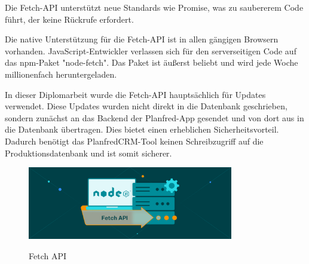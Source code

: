 Die Fetch-API unterstützt neue Standards wie Promise, was zu saubererem Code führt, der keine Rückrufe erfordert.

Die native Unterstützung für die Fetch-API ist in allen gängigen Browsern vorhanden. JavaScript-Entwickler verlassen sich für den serverseitigen Code auf das npm-Paket "node-fetch". Das Paket ist äußerst beliebt und wird jede Woche millionenfach heruntergeladen.

In dieser Diplomarbeit wurde die Fetch-API hauptsächlich für Updates verwendet. Diese Updates wurden nicht direkt in die Datenbank geschrieben, sondern zunächst an das Backend der Planfred-App gesendet und von dort aus in die Datenbank übertragen. Dies bietet einen erheblichen Sicherheitsvorteil. Dadurch benötigt das PlanfredCRM-Tool keinen Schreibzugriff auf die Produktionsdatenbank und ist somit sicherer.
\cite{Fetch_API}
\begin{figure}[h]
    \centering
    \includegraphics[width=0.8\textwidth]{pics/fetch-api.png}
    \caption{Fetch API}
    \cite{fetch_grafik}
\end{figure}




